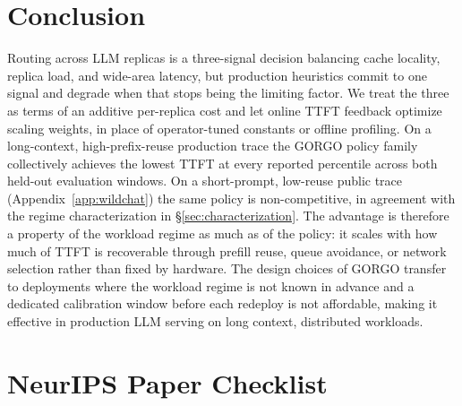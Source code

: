 \documentclass{article}
\newif\ifshowchecklist\showchecklistfalse
\begin{document}
\section{Conclusion}
\label{sec:conclusion}

Routing across LLM replicas is a three-signal decision balancing cache locality, replica
load, and wide-area latency, but production heuristics commit to one signal and
degrade when that stops being the limiting factor. We treat the three as
terms of an additive per-replica cost and let online TTFT feedback optimize 
scaling weights, in place of operator-tuned constants or offline profiling. On a
long-context, high-prefix-reuse production trace the GORGO policy family
collectively achieves the lowest TTFT at every reported percentile across both
held-out evaluation windows. On a short-prompt, low-reuse public
trace (Appendix~\ref{app:wildchat}) the same policy is non-competitive, in
agreement with the regime characterization in
\S\ref{sec:characterization}. The advantage is therefore a property of the
workload regime as much as of the policy: it scales with how much of TTFT is
recoverable through prefill reuse, queue avoidance, or network selection rather
than fixed by hardware. The design choices of GORGO transfer to
deployments where the workload regime is not known in advance and a dedicated
calibration window before each redeploy is not affordable, making it effective in production LLM serving on long context, distributed workloads. 




\ifshowchecklist
\newpage

\section*{NeurIPS Paper Checklist}
\end{document}
